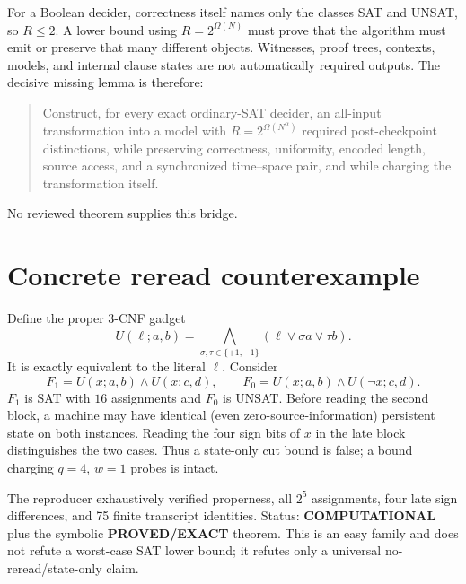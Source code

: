 \documentclass[11pt]{article}
\newcommand{\proved}{\textbf{PROVED/EXACT}}
\newcommand{\comp}{\textbf{COMPUTATIONAL}}
\begin{document}
For a Boolean decider, correctness itself names only the classes SAT and UNSAT, so
$R\le2$.  A lower bound using $R=2^{\Omega(N)}$ must prove that the algorithm must
emit or preserve that many different objects.  Witnesses, proof trees, contexts,
models, and internal clause states are not automatically required outputs.  The
decisive missing lemma is therefore:
\begin{quote}
Construct, for every exact ordinary-SAT decider, an all-input transformation into a
model with $R=2^{\Omega(N^\alpha)}$ required post-checkpoint distinctions, while
preserving correctness, uniformity, encoded length, source access, and a synchronized
time--space pair, and while charging the transformation itself.
\end{quote}
No reviewed theorem supplies this bridge.

\section*{Concrete reread counterexample}
Define the proper 3-CNF gadget
\[
U(\ell;a,b)=\bigwedge_{\sigma,\tau\in\{+1,-1\}}
  (\ell\vee \sigma a\vee \tau b).
\]
It is exactly equivalent to the literal $\ell$.  Consider
\[
F_1=U(x;a,b)\wedge U(x;c,d),\qquad
F_0=U(x;a,b)\wedge U(\neg x;c,d).
\]
$F_1$ is SAT with $16$ assignments and $F_0$ is UNSAT.  Before reading the second
block, a machine may have identical (even zero-source-information) persistent state on
both instances.  Reading the four sign bits of $x$ in the late block distinguishes the
two cases.  Thus a state-only cut bound is false; a bound charging $q=4$, $w=1$ probes
is intact.

The reproducer exhaustively verified properness, all $2^5$ assignments, four late sign
differences, and 75 finite transcript identities.  Status: \comp{} plus the symbolic
\proved{} theorem.  This is an easy family and does not refute a worst-case SAT lower
bound; it refutes only a universal no-reread/state-only claim.
\end{document}
